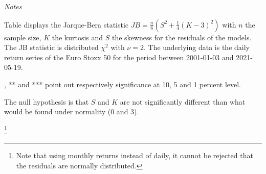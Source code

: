 \documentclass[a4paper, twoside]{templates/ociamthesis}
\begin{document}
\begin{landscape}\begin{table}[h!]

\caption{\label{tab:JBTable}Jarque-Bera Test on standardized residuals}
\centering
\begin{threeparttable}
\begin{tablenotes}[para]
\item \textit{Notes} 
\item Table displays the Jarque-Bera statistic $JB=\frac{n}{6}(S^{2}+\frac{1}{4}(K-3)^{2})$ with $n$ the sample size, $K$ the kurtosis and $S$ the skewness for the residuals of the models. The JB statistic is distributed $\chi^2$ with $\nu = 2$. The underlying data is the daily return series of the Euro Stoxx 50 for the period between 2001-01-03 and 2021-05-19.
\item *, ** and *** point out respectively significance at 10, 5 and 1 percent level.
\item The null hypothesis is that $S$ and $K$ are not significantly different than what would be found under normality (0 and 3).
\end{tablenotes}
\end{threeparttable}
\end{table}
\end{landscape}

\footnote{Note that using monthly returns instead of daily, it cannot be rejected that the residuals are normally distributed.}
\end{document}
